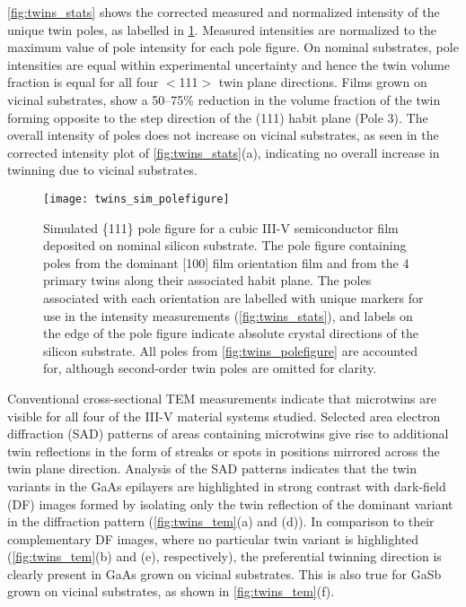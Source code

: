 \cref{fig:twins_stats} shows the corrected measured and normalized intensity of the unique twin poles, as labelled in \cref{fig:twins_sim_polefigure}. Measured intensities are normalized to the maximum value of pole intensity for each pole figure. On nominal substrates, pole intensities are equal within experimental uncertainty and hence the twin volume fraction is equal for all four $<$111$>$ twin plane directions. Films grown on vicinal substrates, show a 50--75\% reduction in the volume fraction of the twin forming opposite to the step direction of the (111) habit plane (Pole 3). The overall intensity of poles does not increase on vicinal substrates, as seen in the corrected intensity plot of \cref{fig:twins_stats}(a), indicating no overall increase in twinning due to vicinal substrates.
\begin{figure}
    \centering
    \texttt{[image: twins\_sim\_polefigure]}
    \caption[Simulated pole figure of twinned III-V on nominal silicon]{\label{fig:twins_sim_polefigure}Simulated \{111\} pole figure for a cubic III-V semiconductor film deposited on nominal silicon substrate. The pole figure containing poles from the dominant [100] film orientation film and from the 4 primary twins along their associated habit plane. The poles associated with each orientation are labelled with unique markers for use in the intensity measurements (\cref{fig:twins_stats}), and labels on the edge of the pole figure indicate absolute crystal directions of the silicon substrate. All poles from \cref{fig:twins_polefigure} are accounted for, although second-order twin poles are omitted for clarity.}
\end{figure}
Conventional cross-sectional TEM measurements indicate that microtwins are visible for all four of the III-V material systems studied. Selected area electron diffraction (SAD) patterns of areas containing microtwins give rise to additional twin reflections in the form of streaks or spots in positions mirrored across the twin plane direction. Analysis of the SAD patterns indicates that the twin variants in the GaAs epilayers are highlighted in strong contrast with dark-field (DF) images formed by isolating only the twin reflection of the dominant variant in the diffraction pattern (\cref{fig:twins_tem}(a) and (d)). In comparison to their complementary DF images, where no particular twin variant is highlighted (\cref{fig:twins_tem}(b) and (e), respectively), the preferential twinning direction is clearly present in GaAs grown on vicinal substrates. This is also true for GaSb grown on vicinal substrates, as shown in \cref{fig:twins_tem}(f).
